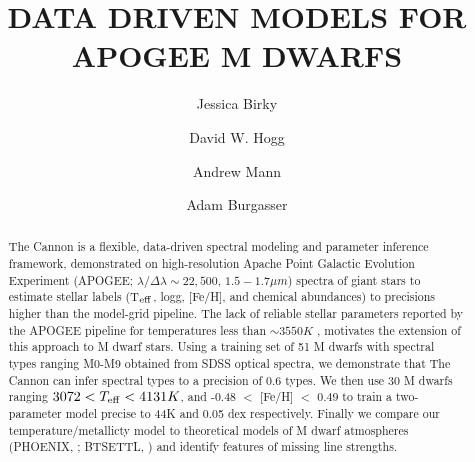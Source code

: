 \documentclass[modern]{aastex62}
\begin{document}
\title{DATA DRIVEN MODELS FOR APOGEE M DWARFS}



\author[0000-0002-7961-6881]{Jessica Birky}

\author[0000-0003-2866-9403]{David W. Hogg}

\author[0000-0003-3654-1602]{Andrew Mann}

\author[0000-0002-6523-9536]{Adam Burgasser}

\begin{abstract}

The Cannon \citep{Ness:2015} is a flexible, data-driven spectral modeling and parameter inference framework, demonstrated on high-resolution Apache Point Galactic Evolution Experiment (APOGEE; $\lambda/\Delta\lambda\sim22,500$, $1.5-1.7 \mu m$) spectra of giant stars to estimate stellar labels (T$_{\rm eff}$, logg, [Fe/H], and chemical abundances) to precisions higher than the model-grid pipeline. The lack of reliable stellar parameters reported by the APOGEE pipeline for temperatures less than $\sim3550K$ \citep{Schmidt:2016}, motivates the extension of this approach to M dwarf stars. Using a training set of 51 M dwarfs with spectral types ranging M0-M9 obtained from SDSS optical spectra, we demonstrate that The Cannon can infer spectral types to a precision of 0.6 types. We then use 30 M dwarfs ranging $3072 < T_{\rm eff} < 4131K$, and -0.48 $<$ [Fe/H] $<$ 0.49 to train a two-parameter model precise to 44K and 0.05 dex respectively. Finally we compare our temperature/metallicty model to theoretical models of M dwarf atmospheres (PHOENIX, \citealt{Husser:2013}; BTSETTL, \citealt{Allard:2011}) and identify features of missing line strengths.

\end{abstract}
\end{document}
